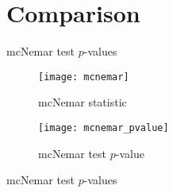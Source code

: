 
\section{Comparison}%
\label{sec:comparison}


\begin{table}[H]
\centering
\caption{mcNemar test $p$-values}
    
\end{table}

\begin{figure}[H]
\centering
\texttt{[image: mcnemar]}
\caption{mcNemar statistic}
\end{figure}

\begin{figure}[H]
\centering
\texttt{[image: mcnemar\_pvalue]}
\caption{mcNemar test $p$-value}
\end{figure}

\begin{table}[H]
\centering
\caption{mcNemar test $p$-values}
    
\end{table}